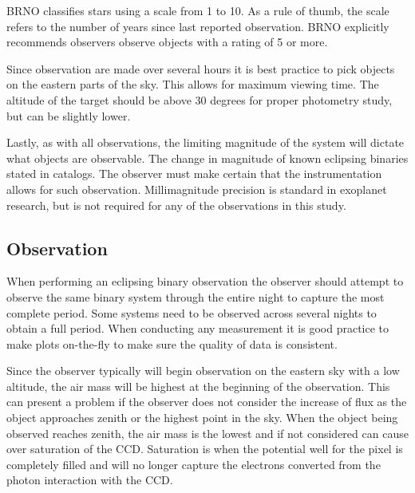 BRNO classifies stars using a scale from 1 to 10.
As a rule of thumb, the scale refers to the number of years since last reported observation.
BRNO explicitly recommends observers observe objects with a rating of 5 or more.

Since observation are made over several hours it is best practice to pick objects on the eastern parts of the sky.
This allows for maximum viewing time. The altitude of the target should be above 30 degrees for proper photometry study, but 
can be slightly lower.

Lastly, as with all observations, the limiting magnitude of the system will dictate what objects are observable.
The change in magnitude of known eclipsing binaries stated in catalogs.
The observer must make certain that the instrumentation allows for such observation.
Millimagnitude precision is standard in exoplanet research, but is not required for any of the observations in this study.

\subsection{Observation}
When performing an eclipsing binary observation the observer should attempt to observe 
the same binary system through the entire night to capture the most complete period. 
Some systems need to be observed across several nights to obtain a full period.
When conducting any measurement it is good practice to make plots on-the-fly to make sure the quality of data is consistent.

Since the observer typically will begin observation on the eastern sky with a low altitude, the air mass will be highest
at the beginning of the observation.
This can present a problem if the observer does not consider the increase of flux as the object approaches zenith or the highest
point in the sky.
When the object being observed reaches zenith, the air mass is the lowest and if not considered can cause over saturation of the CCD\@.
Saturation is when the potential well for the pixel is completely filled and will no longer capture the electrons
converted from the photon interaction with the CCD\@.

